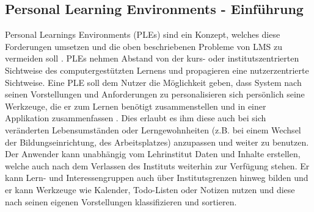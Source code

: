 \subsection{Personal Learning Environments - Einführung}\label{section:ple_intro}
Personal Learnings Environments (PLEs) sind ein Konzept, welches diese Forderungen umsetzen und die oben beschriebenen Probleme von LMS zu vermeiden soll \cite{Attwell2007}. PLEs nehmen Abstand von der kurs- oder institutszentrierten Sichtweise des computergestützten Lernens und propagieren eine nutzerzentrierte Sichtweise. Eine PLE soll dem Nutzer die Möglichkeit geben, dass System nach seinen Vorstellungen und Anforderungen zu personalisieren sich persönlich seine Werkzeuge, die er zum Lernen benötigt zusammenstellen und in einer Applikation zusammenfassen \cite{VanHarmelen}. Dies erlaubt es ihm diese auch bei sich veränderten Lebensumständen oder Lerngewohnheiten (z.B. bei einem Wechsel der Bildungseinrichtung, des Arbeitsplatzes) anzupassen und weiter zu benutzen. Der Anwender kann unabhängig vom Lehrinstitut Daten und Inhalte erstellen, welche auch nach dem Verlassen des Instituts weiterhin zur Verfügung stehen. Er kann Lern- und Interessengruppen auch über Institutsgrenzen hinweg bilden \cite{Schaffert2008a} und er kann Werkzeuge wie Kalender, Todo-Listen oder Notizen nutzen und diese nach seinen eigenen Vorstellungen klassifizieren und sortieren.